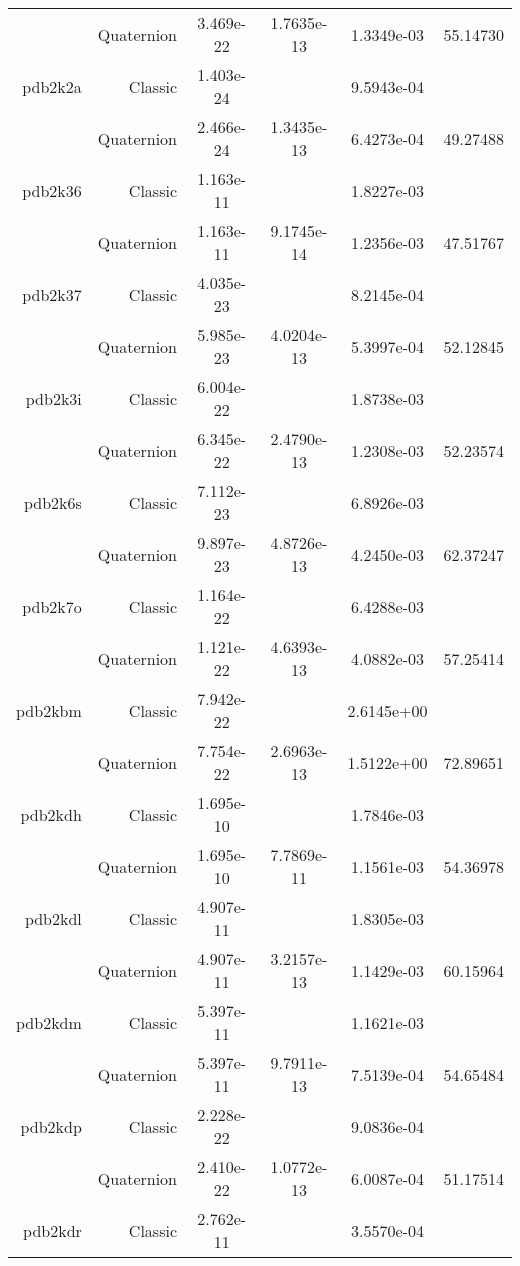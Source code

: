 \begin{xltabular}{\textwidth}{r|rS[table-format=1.3e+2]S[table-format=1.4e+2]S[table-format=1.4e+2]S[table-format=-1.5]}
& Quaternion & 3.469e-22 & 1.7635e-13 & 1.3349e-03 & 55.14730\\  \addlinespace
pdb2k2a & Classic & 1.403e-24 &  & 9.5943e-04 & \\
& Quaternion & 2.466e-24 & 1.3435e-13 & 6.4273e-04 & 49.27488\\  \addlinespace
pdb2k36 & Classic & 1.163e-11 &  & 1.8227e-03 & \\
& Quaternion & 1.163e-11 & 9.1745e-14 & 1.2356e-03 & 47.51767\\  \addlinespace
pdb2k37 & Classic & 4.035e-23 &  & 8.2145e-04 & \\
& Quaternion & 5.985e-23 & 4.0204e-13 & 5.3997e-04 & 52.12845\\  \addlinespace
pdb2k3i & Classic & 6.004e-22 &  & 1.8738e-03 & \\
& Quaternion & 6.345e-22 & 2.4790e-13 & 1.2308e-03 & 52.23574\\  \addlinespace
pdb2k6s & Classic & 7.112e-23 &  & 6.8926e-03 & \\
& Quaternion & 9.897e-23 & 4.8726e-13 & 4.2450e-03 & 62.37247\\  \addlinespace
pdb2k7o & Classic & 1.164e-22 &  & 6.4288e-03 & \\
& Quaternion & 1.121e-22 & 4.6393e-13 & 4.0882e-03 & 57.25414\\  \addlinespace
pdb2kbm & Classic & 7.942e-22 &  & 2.6145e+00 & \\
& Quaternion & 7.754e-22 & 2.6963e-13 & 1.5122e+00 & 72.89651\\  \addlinespace
pdb2kdh & Classic & 1.695e-10 &  & 1.7846e-03 & \\
& Quaternion & 1.695e-10 & 7.7869e-11 & 1.1561e-03 & 54.36978\\  \addlinespace
pdb2kdl & Classic & 4.907e-11 &  & 1.8305e-03 & \\
& Quaternion & 4.907e-11 & 3.2157e-13 & 1.1429e-03 & 60.15964\\  \addlinespace
pdb2kdm & Classic & 5.397e-11 &  & 1.1621e-03 & \\
& Quaternion & 5.397e-11 & 9.7911e-13 & 7.5139e-04 & 54.65484\\  \addlinespace
pdb2kdp & Classic & 2.228e-22 &  & 9.0836e-04 & \\
& Quaternion & 2.410e-22 & 1.0772e-13 & 6.0087e-04 & 51.17514\\  \addlinespace
pdb2kdr & Classic & 2.762e-11 &  & 3.5570e-04 & \\

\end{xltabular}
